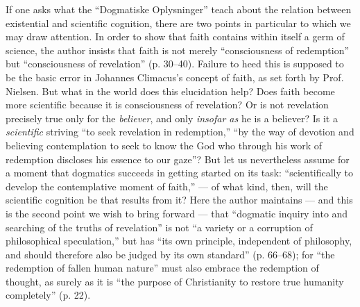 \documentclass[12pt,a4paper]{book}
\newcommand{\opage}[1]{\marginnote{\footnotesize\textit{[#1]}}}
\begin{document}
If one asks what the ``Dogmatiske Oplysninger'' teach
about the relation between existential and scientific cognition,
there are two points in particular to which we may draw
attention. In order to show that faith contains within itself
a germ of science, the author insists that faith is not merely
``consciousness of redemption'' but ``consciousness of revelation'' (p.
30--40). Failure to heed this is supposed to be the basic error
in Johannes Climacus's concept of faith, as set forth by Prof. Nielsen.
But what in the world does this elucidation help? Does
faith become more scientific because it is consciousness of revelation?
Or is not revelation precisely true only for the \emph{believer},
and only \emph{insofar as} he is a believer? Is it a \emph{scientific}
striving ``to seek revelation in redemption,''
``by the way of devotion and believing contemplation to seek to
know the God who through his work of redemption discloses
his essence to our gaze''? But let us nevertheless assume for a moment
that dogmatics succeeds in getting started on its
task: ``scientifically to develop the contemplative moment of faith,''
--- of what kind, then, will the scientific
cognition be that results from it? Here the author maintains --- and
\opage{34}\setcounter{footnote}{0}%
this is the second point we wish to bring forward --- that ``dogmatic
inquiry into and searching of the truths of revelation''
is not ``a variety or a corruption of philosophical
speculation,'' but has ``its own principle, independent of philosophy,
and should therefore also be judged by its own standard''
(p. 66--68); for ``the redemption of fallen human nature''
must also embrace the redemption of thought, as surely as it
is ``the purpose of Christianity to restore true
humanity completely'' (p. 22).
\end{document}
